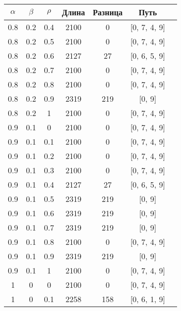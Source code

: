 \begin{table}[H]
	\begin{center}
\begin{tabular}{|c@{\hspace{7mm}}|c@{\hspace{7mm}}|c@{\hspace{7mm}}|c@{\hspace{7mm}}|c@{\hspace{7mm}}|c@{\hspace{7mm}}|c|}
		\hline
		$\alpha$        & $\beta$      & $\rho$      &Длина  & Разница & Путь \\
			
			\hline
0.8  & 0.2  & 0.4  & 2100  & 0     & [0, 7, 4, 9]\\
0.8  & 0.2  & 0.5  & 2100  & 0     & [0, 7, 4, 9]\\
0.8  & 0.2  & 0.6  & 2127  & 27    & [0, 6, 5, 9]\\
0.8  & 0.2  & 0.7  & 2100  & 0     & [0, 7, 4, 9]\\
\hline
0.8  & 0.2  & 0.8  & 2100  & 0     & [0, 7, 4, 9]\\
0.8  & 0.2  & 0.9  & 2319  & 219   & [0, 9]\\
0.8  & 0.2  & 1    & 2100  & 0     & [0, 7, 4, 9]\\
0.9  & 0.1  & 0    & 2100  & 0     & [0, 7, 4, 9]\\
\hline
0.9  & 0.1  & 0.1  & 2100  & 0     & [0, 7, 4, 9]\\
0.9  & 0.1  & 0.2  & 2100  & 0     & [0, 7, 4, 9]\\
0.9  & 0.1  & 0.3  & 2100  & 0     & [0, 7, 4, 9]\\
0.9  & 0.1  & 0.4  & 2127  & 27    & [0, 6, 5, 9]\\
\hline
0.9  & 0.1  & 0.5  & 2319  & 219   & [0, 9]\\
0.9  & 0.1  & 0.6  & 2319  & 219   & [0, 9]\\
0.9  & 0.1  & 0.7  & 2319  & 219   & [0, 9]\\
0.9  & 0.1  & 0.8  & 2100  & 0     & [0, 7, 4, 9]\\
\hline
0.9  & 0.1  & 0.9  & 2319  & 219   & [0, 9]\\
0.9  & 0.1  & 1    & 2100  & 0     & [0, 7, 4, 9]\\
1    & 0    & 0    & 2100  & 0     & [0, 7, 4, 9]\\
1    & 0    & 0.1  & 2258  & 158   & [0, 6, 1, 9]\\
\hline
	\end{tabular}

\end{center}

\end{table}

